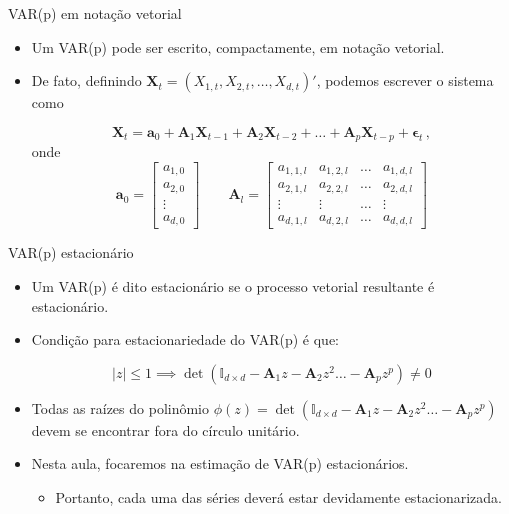 \documentclass[11pt]{beamer}
\begin{document}
\begin{frame}{VAR(p) em notação vetorial}
	\begin{itemize}
		\item Um VAR(p) pode ser escrito, compactamente, em notação vetorial.
		\item De fato, definindo $\boldsymbol{X}_t = (X_{1,t},X_{2,t},\ldots, X_{d,t})'$, podemos escrever o sistema como
		
		\begin{equation*}
			\boldsymbol{X}_t = \boldsymbol{a}_0 + \boldsymbol{A}_1 \boldsymbol{X}_{t-1} + \boldsymbol{A}_2 \boldsymbol{X}_{t-2} + \ldots + \boldsymbol{A}_p \boldsymbol{X}_{t-p} + \boldsymbol{\epsilon}_t \, ,
		\end{equation*}
		onde
		$$\boldsymbol{a}_0 = \begin{bmatrix}
			a_{1,0} \\
			a_{2,0} \\
			\vdots \\
			a_{d,0}
		\end{bmatrix} \quad \quad \boldsymbol{A}_l = \begin{bmatrix}
			a_{1,1,l} & 	a_{1,2,l} & \ldots &	a_{1,d,l} \\
			a_{2,1,l} &  	a_{2,2,l}  &  \ldots & a_{2,d,l} \\
			\vdots & \vdots  & \ldots & \vdots  \\
			a_{d,1,l} & a_{d,2,l} & \ldots & a_{d,d,l}
		\end{bmatrix}$$ 
	\end{itemize}
\end{frame}
\begin{frame}{VAR(p) estacionário}
	\begin{itemize}
		\item Um VAR(p) é dito estacionário se o processo vetorial resultante é estacionário.
		\item Condição para estacionariedade do VAR(p) é que:
		
		$$ |z| \leq 1 \implies \operatorname{det}(\mathbb{I}_{d\times d} - \boldsymbol{A}_1 z - \boldsymbol{A}_2 z^2 \ldots -  \boldsymbol{A}_p z^p ) \neq 0$$
		\item Todas as raízes do polinômio $\phi(z) = \operatorname{det}(\mathbb{I}_{d\times d} - \boldsymbol{A}_1 z - \boldsymbol{A}_2 z^2 \ldots -  \boldsymbol{A}_p z^p )$ devem se encontrar fora do círculo unitário.
		\item Nesta aula, focaremos na estimação de VAR(p) estacionários.
		\begin{itemize}
			\item Portanto, cada uma das séries deverá estar devidamente estacionarizada. 
		\end{itemize}
	\end{itemize}
\end{frame}
\end{document}
